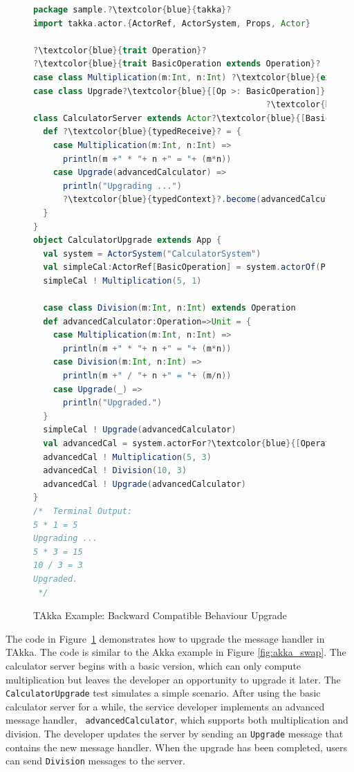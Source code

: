 \begin{figure}[p]
\begin{lstlisting}[language=scala, escapechar=?]
package sample.?\textcolor{blue}{takka}?
import takka.actor.{ActorRef, ActorSystem, Props, Actor}

?\textcolor{blue}{trait Operation}?
?\textcolor{blue}{trait BasicOperation extends Operation}?
case class Multiplication(m:Int, n:Int) ?\textcolor{blue}{extends BasicOperation}?
case class Upgrade?\textcolor{blue}{[Op >: BasicOperation]}?(advancedCalculator:?\textcolor{blue}{Op=>Unit}?)
                                               ?\textcolor{blue}{extends BasicOperation }?
class CalculatorServer extends Actor?\textcolor{blue}{[BasicOperation]}? { 
  def ?\textcolor{blue}{typedReceive}? = {
    case Multiplication(m:Int, n:Int) => 
      println(m +" * "+ n +" = "+ (m*n))
    case Upgrade(advancedCalculator) =>
      println("Upgrading ...")
      ?\textcolor{blue}{typedContext}?.become(advancedCalculator)    
  }
}
object CalculatorUpgrade extends App {
  val system = ActorSystem("CalculatorSystem") 
  val simpleCal:ActorRef[BasicOperation] = system.actorOf(Props[?\textcolor{blue}{BasicOperation}?, CalculatorServer], "calculator")
  simpleCal ! Multiplication(5, 1)
  
  case class Division(m:Int, n:Int) extends Operation
  def advancedCalculator:Operation=>Unit = {
    case Multiplication(m:Int, n:Int) => 
      println(m +" * "+ n +" = "+ (m*n))
    case Division(m:Int, n:Int) => 
      println(m +" / "+ n +" = "+ (m/n))
    case Upgrade(_) =>
      println("Upgraded.")
  }
  simpleCal ! Upgrade(advancedCalculator)    
  val advancedCal = system.actorFor?\textcolor{blue}{[Operation]}?("akka://CalculatorSystem/user/calculator")   
  advancedCal ! Multiplication(5, 3)
  advancedCal ! Division(10, 3)
  advancedCal ! Upgrade(advancedCalculator)
}
/*  Terminal Output:
5 * 1 = 5
Upgrading ...
5 * 3 = 15
10 / 3 = 3
Upgraded.
 */
\end{lstlisting}
  \caption{TAkka Example: Backward Compatible Behaviour Upgrade}
  \label{fig:takka_swap} 
\end{figure}

The code in Figure~\ref{fig:takka_swap} demonstrates how to upgrade the message 
handler in TAkka.  The code is similar to the Akka example in Figure 
\ref{fig:akka_swap}.  The calculator server begins with a basic version, which
can only compute multiplication but leaves the developer an 
opportunity to upgrade it later.   The {\tt CalculatorUpgrade} test simulates a 
simple scenario.  After using the basic calculator server for a while, the 
service developer implements an advanced message handler, {\tt 
advancedCalculator}, which supports both multiplication and division.  The 
developer updates the server by sending an {\tt Upgrade} message that contains 
the new message handler.  When the upgrade has been completed, users can 
send {\tt Division} messages to the server.

